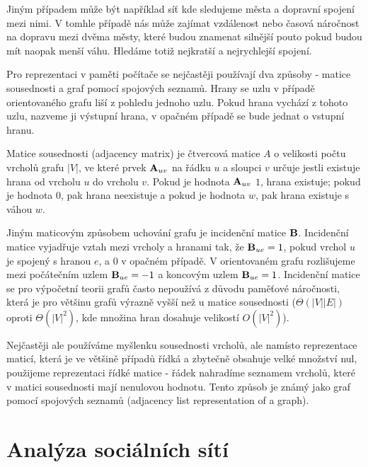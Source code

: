 \documentclass[12pt,titlepage]{report}
\begin{document}
Jiným případem může být například síť kde sledujeme města a dopravní spojení
mezi nimi. V tomhle případě nás může zajímat vzdálenost nebo časová náročnost
na dopravu mezi dvěma městy, které budou znamenat silnější pouto pokud budou
mít naopak menší váhu. Hledáme totiž nejkratší a nejrychlejší spojení.


Pro reprezentaci v paměti počítače se nejčastěji používají dva způsoby - matice sousednosti a graf pomocí spojových seznamů.
Hrany se uzlu v případě orientovaného grafu liší z pohledu jednoho uzlu. Pokud
hrana vychází z tohoto uzlu, nazveme ji výstupní hrana, v opačném případě se
bude jednat o vstupní hranu.


Matice sousednosti (adjacency matrix) je čtvercová matice $A$ o velikosti počtu
vrcholů grafu $|V|$, ve které prvek ${\bf A}_{uv}$ na řádku $u$ a sloupci $v$
určuje jestli existuje hrana od vrcholu $u$ do vrcholu $v$. Pokud je hodnota
${\bf A}_{uv}$ $1$, hrana existuje; pokud je hodnota $0$, pak hrana neexistuje
a pokud je hodnota $w$, pak hrana existuje s váhou $w$.

Jiným maticovým způsobem uchování grafu je incidenční matice ${\bf B}$.
Incidenční matice vyjadřuje vztah mezi vrcholy a hranami tak, že ${\bf B}_{ue}
= 1$, pokud vrchol $u$ je spojený s hranou $e$, a $0$ v opačném případě. V
orientovaném grafu rozlišujeme mezi počátečním uzlem ${\bf B}_{ue} = -1$ a
koncovým uzlem ${\bf B}_{ue} = 1$. Incidenční matice se pro výpočetní teorii
grafů často nepoužívá z důvodu paměťové náročnosti, která je pro většinu grafů
výrazně vyšší než u matice sousednosti ($\Theta(|V||E|)$ oproti $\Theta(|V|^2)$, kde množina hran dosahuje velikostí $O(|V|^2)$).

Nejčastěji ale používáme myšlenku sousednosti vrcholů, ale namísto reprezentace
maticí, která je ve většině případů řídká a zbytečně obsahuje velké množství
nul, použijeme reprezentaci řídké matice - řádek nahradíme seznamem vrcholů,
které v matici sousednosti mají nenulovou hodnotu. Tento způsob je známý jako
graf pomocí spojových seznamů (adjacency list representation of a graph).

\section{Analýza sociálních sítí}
\end{document}
